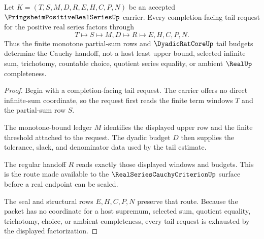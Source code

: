 \begin{theorem}
\label{thm:pringsheim-positive-real-series-tail-bound}
Let $K=(T,S,M,D,R,E,H,C,P,N)$ be an accepted $\PringsheimPositiveRealSeriesUp$ carrier. Every completion-facing tail request for the positive real series factors through
$$
T \longmapsto S \longmapsto M,D \longmapsto R \longmapsto E,H,C,P,N .
$$
Thus the finite monotone partial-sum rows and $\DyadicRatCoreUp$ tail budgets determine the Cauchy handoff, not a host least upper bound, selected infinite sum, trichotomy, countable choice, quotient series equality, or ambient $\RealUp$ completeness.
\end{theorem}
\begin{proof}
Begin with a completion-facing tail request. The carrier offers no direct infinite-sum coordinate, so the request first reads the finite term windows $T$ and the partial-sum row $S$.

The monotone-bound ledger $M$ identifies the displayed upper row and the finite threshold attached to the request. The dyadic budget $D$ then supplies the tolerance, slack, and denominator data used by the tail estimate.

The regular handoff $R$ reads exactly those displayed windows and budgets. This is the route made available to the $\RealSeriesCauchyCriterionUp$ surface before a real endpoint can be sealed.

The seal and structural rows $E,H,C,P,N$ preserve that route. Because the packet has no coordinate for a host supremum, selected sum, quotient equality, trichotomy, choice, or ambient completeness, every tail request is exhausted by the displayed factorization.
\end{proof}

